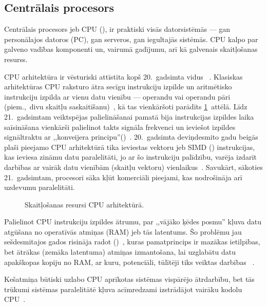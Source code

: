 \subsection{Centrālais procesors} \label{sec:cpu}
Centrālais procesors jeb CPU (), ir
praktiski visās datorsistēmās --- gan personālajos datoros (PC), gan serveros,
gan iegultajās sistēmās. CPU kalpo par galveno vadības komponenti un, vairumā
gadījumu, arī kā galvenais skaitļošanas resurss.

CPU arhitektūra ir vēsturiski attīstīta kopš 20.~gadsimta vidus~%
\cite{Flynn-arch}\cite{von-Neumann}.
Klasiskas arhitektūras CPU raksturo ātra secīgu instrukciju izpilde
un aritmētisko instrukciju izpilda ar vienu datu vienību --- 
operandu vai operandu pāri (piem.,~divu skaitļu saskaitīšanu)~\cite{Flynn-arch},
kā tas vienkāršoti parādīts \ref{fig:cpu-arch}~attēlā.
Līdz 21.~gadsimtam veiktspējas palielināšanai pamatā bija 
instrukcijas izpildes laika saīsināšana vienkārši 
palielinot takts signāla frekvenci
un ieviešot izpildes signāltraktu ar ,,konveijera principu''()~\cite{Flynn-arch}.
20.~gadsimta deviņdesmito gadu beigās plaši pieejamo CPU arhitektūrā tika ieviestas
vektoru jeb SIMD () 
instrukcijas, kas ieviesa zināmu datu paralelitāti, jo ar šo instrukciju
palīdzību, varēja izdarīt darbības ar vairāk datu vienībām (skaitļu vektoru)
vienlaikus~\cite{SIMD}.
Savukārt, sākoties 21.~gadsimtam,  procesori
sāka kļūt komerciāli pieejami, kas nodrošināja arī uzdevumu paralelitāti.

\begin{figure}[tbh]
	\centering
	\def\svgscale{1.2}
	{}
	\caption{Skaitļošanas resursi CPU arhitektūrā.}
	\label{fig:cpu-arch}
\end{figure}

\label{sec:cache}
Palielinot CPU instrukciju izpildes ātrumu, par
,,vājāko ķēdes posmu'' kļuva datu atgūšana no operatīvās atmiņas (RAM) jeb
tās latentums.
Šo problēmu jau sešdesmitajos gados risināja radot
 ()~\cite{Patterson},
kuras pamatprincips ir mazākas ietilpības, bet ātrākas (zemāka latentuma)
atmiņas izmantošana, lai uzglabātu datu apakškopas kopiju no
RAM, ar kuru, potenciāli, tūlītēji tiks veiktas darbības~%
\cite{Flynn-arch}\cite{Patterson2}\cite{Patterson}\cite{Cache}.

Kešatmiņa būtiski uzlabo CPU aprīkotas sistēmas vispārējo
ātrdarbību, bet tās trūkumi sistēmas paralelitātē kļuva acīmredzami
izstrādājot vairāku kodolu CPU~\cite{Fatahalian}\cite{Owens-GPU}\cite{Cache}.

